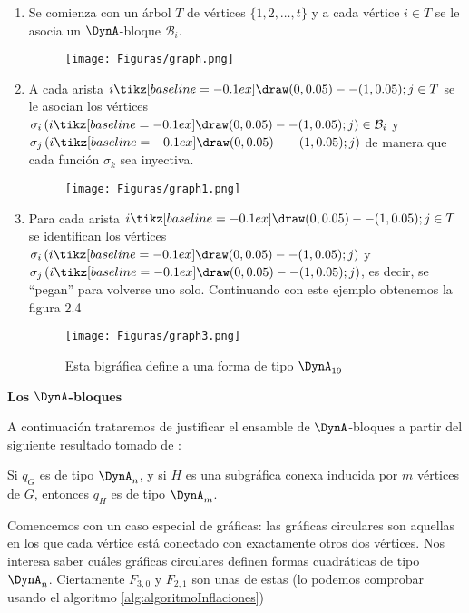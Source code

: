 \begin{enumerate}
\item Se comienza con un árbol $T$ de vértices $\{1, 2, \ldots, t\}$ y a cada vértice $i \in T$ se le asocia un $\DynA$-bloque $\mathcal{B}_{i}$.
 \begin{figure}[H]
    \centering%
    \texttt{[image: Figuras/graph.png]}
\end{figure}
\item A cada arista $i \tikz[baseline=-0.1ex]\draw (0,0.05) -- (1,0.05); j \in T$ se le asocian los vértices $\sigma_{i}\left(i \tikz[baseline=-0.1ex]\draw (0,0.05) -- (1,0.05); j\right) \in \mathcal{B}_{i}$ y $\sigma_{j}\left(i \tikz[baseline=-0.1ex]\draw (0,0.05) -- (1,0.05); j \right)$ de manera que cada función $\sigma_{k}$ sea inyectiva.
 \begin{figure}[H]
    \centering%
    \texttt{[image: Figuras/graph1.png]}
\end{figure}
\item Para cada arista $i \tikz[baseline=-0.1ex]\draw (0,0.05) -- (1,0.05); j \in T$ se identifican los vértices $\sigma_{i}\left(i \tikz[baseline=-0.1ex]\draw (0,0.05) -- (1,0.05); j\right)$ y $\sigma_{j}\left(i \tikz[baseline=-0.1ex]\draw (0,0.05) -- (1,0.05); j\right)$, es decir, se “pegan” para volverse uno solo. Continuando con este ejemplo obtenemos la figura 2.4
 \begin{figure}[H]
    \centering%
    \texttt{[image: Figuras/graph3.png]}
     \caption{Esta bigráfica define a una forma de tipo $\DynA_{19}$}
    \label{figura:2.4}
\end{figure}
\end{enumerate}
\textbf{Los $\DynA$-bloques}

A continuación trataremos de justificar el ensamble de $\DynA$-bloques a partir del siguiente resultado tomado de \citep{article123}:
\begin{theorem}
Si $q_{G}$ es de tipo $\DynA_{n}$, y si $H$ es una subgráfica conexa inducida por $m$ vértices de $G$, entonces $q_{H}$ es de tipo $\DynA_{m}$.
\label{teorema:2.5}
\end{theorem}
Comencemos con un caso especial de gráficas: las gráficas circulares son aquellas en los que cada vértice está conectado con exactamente otros dos vértices. Nos interesa saber cuáles gráficas circulares definen formas cuadráticas de tipo $\DynA_{n}$. Ciertamente $F_{3,0}$ y $F_{2,1}$ son unas de estas (lo podemos comprobar usando el algoritmo \ref{alg:algoritmoInflaciones})

